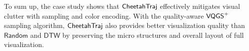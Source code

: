To sum up, the case study shows that $\mathsf{CheetahTraj}$ effectively mitigates visual clutter with sampling and color encoding. With the quality-aware $\mathsf{VQGS}^+$ sampling algorithm, $\mathsf{CheetahTraj}$ also provides better visualization quality than $\mathsf{Random}$ and $\mathsf{DTW}$ by preserving the micro structures and overall layout of full visualization.
